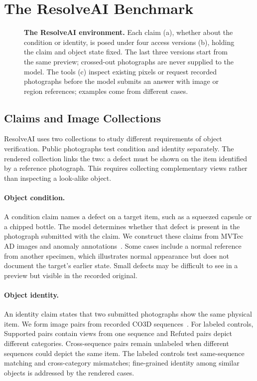 \documentclass[10pt,twocolumn,letterpaper]{article}
\newcommand{\benchmark}{ResolveAI\xspace}
\begin{document}
\section{The \benchmark Benchmark}

\begin{figure}[t]\centering
\resizebox{\textwidth}{!}{}
\caption{\textbf{The \benchmark environment.}
Each claim (a), whether about the condition or identity, is posed under four access versions (b), holding the claim and object state fixed.
The last three versions start from the same preview; crossed-out photographs are never supplied to the model.
The tools (c) inspect existing pixels or request recorded photographs before the model submits an answer with image or region references; examples come from different cases.}
\label{fig:framework}
\end{figure}

\subsection{Claims and Image Collections}
\benchmark uses two collections to study different requirements of object verification.
Public photographs test condition and identity separately.
The rendered collection links the two: a defect must be shown on the item identified by a reference photograph.
This requires collecting complementary views rather than inspecting a look-alike object.

\paragraph{Object condition.}
A condition claim names a defect on a target item, such as a squeezed capsule or a chipped bottle.
The model determines whether that defect is present in the photograph submitted with the claim.
We construct these claims from MVTec AD images and anomaly annotations~\cite{mvtec}.
Some cases include a normal reference from another specimen, which illustrates normal appearance but does not document the target's earlier state.
Small defects may be difficult to see in a preview but visible in the recorded original.

\paragraph{Object identity.}
An identity claim states that two submitted photographs show the same physical item.
We form image pairs from recorded CO3D sequences~\cite{co3d}.
For labeled controls, Supported pairs contain views from one sequence and Refuted pairs depict different categories.
Cross-sequence pairs remain unlabeled when different sequences could depict the same item.
The labeled controls test same-sequence matching and cross-category mismatches; fine-grained identity among similar objects is addressed by the rendered cases.
\end{document}
